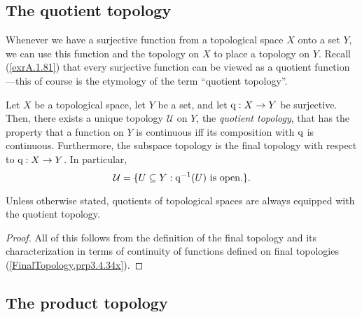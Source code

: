 \subsection{The quotient topology}

Whenever we have a surjective function from a topological space $X$ onto a set $Y$, we can use this function and the topology on $X$ to place a topology on $Y$.  Recall (\cref{exrA.1.81}) that every surjective function can be viewed as a quotient function---this of course is the etymology of the term ``quotient topology''.
\begin{prp}
Let $X$ be a topological space, let $Y$ be a set, and let $\mathrm{q} :X\rightarrow Y$ be surjective.  Then, there exists a unique topology $\mathcal{U}$ on $Y$, the \emph{quotient topology}, that has the property that a function on $Y$ is continuous iff its composition with $\mathrm{q}$ is continuous.  Furthermore, the subspace topology is the final topology with respect to $\mathrm{q} :X\rightarrow Y$.  In particular,
\begin{equation}
\mathcal{U}=\{ U\subseteq Y:\mathrm{q} ^{-1}(U)\text{ is open.}\} .
\end{equation}
\begin{rmk}
Unless otherwise stated, quotients of topological spaces are always equipped with the quotient topology.
\end{rmk}
\begin{proof}
All of this follows from the definition of the final topology and its characterization in terms of continuity of functions defined on final topologies (\cref{FinalTopology,prp3.4.34x}).
\end{proof}
\end{prp}

\subsection{The product topology}

